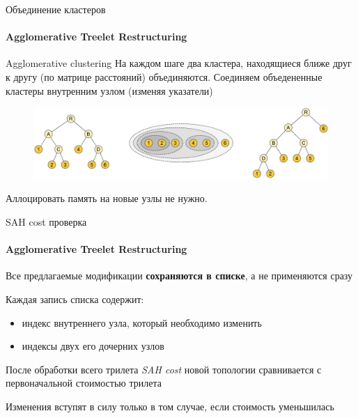\documentclass{beamer}
\begin{document}
\begin{frame}{Объединение кластеров}
    \framesubtitle{Agglomerative Treelet Restructuring}
    \begin{block}{Agglomerative clustering}
        На каждом шаге два кластера, находящиеся ближе друг к другу (по матрице расстояний) объединяются.
        Соединяем объедененные кластеры внутренним узлом (изменяя указатели)
    \end{block}

    \begin{figure}
        \includegraphics[keepaspectratio, width=\textwidth]{res/merge_treelets.png}
    \end{figure}

    Аллоцировать память на новые узлы не нужно.
\end{frame}

\begin{frame}[t]{SAH cost проверка}
    \framesubtitle{Agglomerative Treelet Restructuring}
    \begin{block}{}
        Все предлагаемые модификации \textbf{сохраняются в списке}, а не применяются сразу
    \end{block}
    Каждая запись списка содержит:
    \begin{itemize}
        \item 
            индекс внутреннего узла, который необходимо изменить
        \item 
            индексы двух его дочерних узлов
    \end{itemize}

    После обработки всего трилета \textit{SAH cost} новой топологии сравнивается
    с первоначальной стоимостью трилета
    \begin{block}{}
        Изменения вступят в силу только в том случае, если стоимость уменьшилась
    \end{block}

\end{frame}
\end{document}
